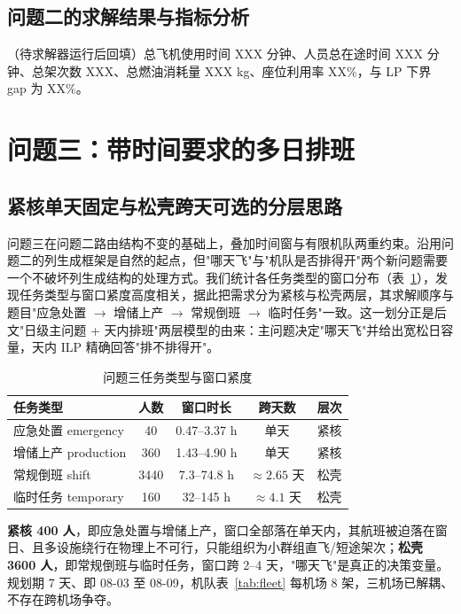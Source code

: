 \documentclass[zihao=-4,a4paper]{ctexart}
\begin{document}
\subsection{问题二的求解结果与指标分析}

（待求解器运行后回填）总飞机使用时间 XXX 分钟、人员总在途时间 XXX 分钟、总架次数 XXX、总燃油消耗量 XXX kg、座位利用率 XX\%，与 LP 下界 gap 为 XX\%。

\section{问题三：带时间要求的多日排班}

\subsection{紧核单天固定与松壳跨天可选的分层思路}

问题三在问题二路由结构不变的基础上，叠加时间窗与有限机队两重约束。沿用问题二的列生成框架是自然的起点，但"哪天飞"与"机队是否排得开"两个新问题需要一个不破坏列生成结构的处理方式。我们统计各任务类型的窗口分布（表~\ref{tab:q3data}），发现任务类型与窗口紧度高度相关，据此把需求分为紧核与松壳两层，其求解顺序与题目"应急处置 $\to$ 增储上产 $\to$ 常规倒班 $\to$ 临时任务"一致。这一划分正是后文"日级主问题 + 天内排班"两层模型的由来：主问题决定"哪天飞"并给出宽松日容量，天内 ILP 精确回答"排不排得开"。

\begin{table}[H]
  \centering
  \caption{问题三任务类型与窗口紧度}
  \label{tab:q3data}
  \begin{tabular}{lcccc}
    \toprule
    任务类型 & 人数 & 窗口时长 & 跨天数 & 层次 \\
    \midrule
    应急处置 emergency & 40 & 0.47--3.37 h & 单天 & 紧核 \\
    增储上产 production & 360 & 1.43--4.90 h & 单天 & 紧核 \\
    常规倒班 shift & 3440 & 7.3--74.8 h & $\approx2.65$ 天 & 松壳 \\
    临时任务 temporary & 160 & 32--145 h & $\approx4.1$ 天 & 松壳 \\
    \bottomrule
  \end{tabular}
\end{table}

\textbf{紧核 400 人}，即应急处置与增储上产，窗口全部落在单天内，其航班被迫落在窗日、且多设施绕行在物理上不可行，只能组织为小群组直飞/短途架次；\textbf{松壳 3600 人}，即常规倒班与临时任务，窗口跨 2--4 天，"哪天飞"是真正的决策变量。规划期 7 天、即 08-03 至 08-09，机队表~\ref{tab:fleet} 每机场 8 架，三机场已解耦、不存在跨机场争夺。
\end{document}
